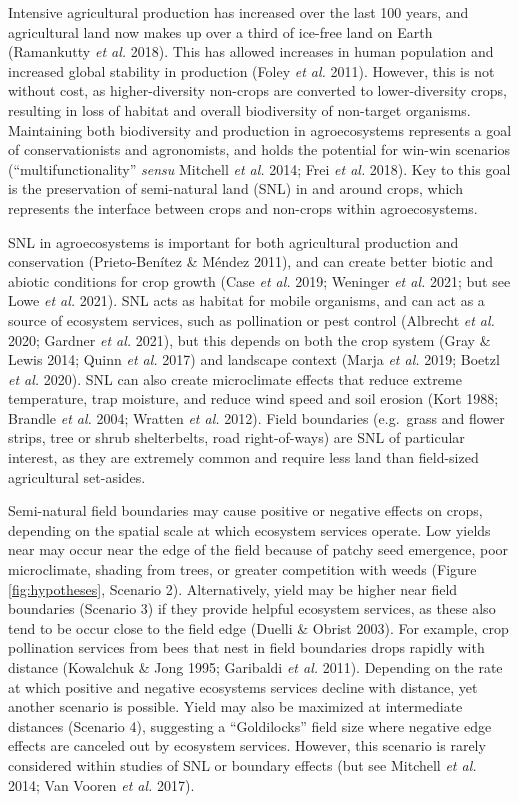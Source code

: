 \documentclass[]{elsarticle} %
\begin{document}
Intensive agricultural production has increased over the last 100 years, and agricultural land now makes up over a third of ice-free land on Earth (Ramankutty \emph{et al.} 2018).
This has allowed increases in human population and increased global stability in production (Foley \emph{et al.} 2011).
However, this is not without cost, as higher-diversity non-crops are converted to lower-diversity crops, resulting in loss of habitat and overall biodiversity of non-target organisms.
Maintaining both biodiversity and production in agroecosystems represents a goal of conservationists and agronomists, and holds the potential for win-win scenarios ({``multifunctionality''} \emph{sensu} Mitchell \emph{et al.} 2014; Frei \emph{et al.} 2018).
Key to this goal is the preservation of semi-natural land (SNL) in and around crops, which represents the interface between crops and non-crops within agroecosystems.

SNL in agroecosystems is important for both agricultural production and conservation (Prieto-Benítez \& Méndez 2011), and can create better biotic and abiotic conditions for crop growth (Case \emph{et al.} 2019; Weninger \emph{et al.} 2021; but see Lowe \emph{et al.} 2021).
SNL acts as habitat for mobile organisms, and can act as a source of ecosystem services, such as pollination or pest control (Albrecht \emph{et al.} 2020; Gardner \emph{et al.} 2021), but this depends on both the crop system (Gray \& Lewis 2014; Quinn \emph{et al.} 2017) and landscape context (Marja \emph{et al.} 2019; Boetzl \emph{et al.} 2020).
SNL can also create microclimate effects that reduce extreme temperature, trap moisture, and reduce wind speed and soil erosion (Kort 1988; Brandle \emph{et al.} 2004; Wratten \emph{et al.} 2012).
Field boundaries (e.g.~grass and flower strips, tree or shrub shelterbelts, road right-of-ways) are SNL of particular interest, as they are extremely common and require less land than field-sized agricultural set-asides.

Semi-natural field boundaries may cause positive or negative effects on crops, depending on the spatial scale at which ecosystem services operate.
Low yields near may occur near the edge of the field because of patchy seed emergence, poor microclimate, shading from trees, or greater competition with weeds (Figure \ref{fig:hypotheses}, Scenario 2).
Alternatively, yield may be higher near field boundaries (Scenario 3) if they provide helpful ecosystem services, as these also tend to be occur close to the field edge (Duelli \& Obrist 2003).
For example, crop pollination services from bees that nest in field boundaries drops rapidly with distance (Kowalchuk \& Jong 1995; Garibaldi \emph{et al.} 2011).
Depending on the rate at which positive and negative ecosystems services decline with distance, yet another scenario is possible.
Yield may also be maximized at intermediate distances (Scenario 4), suggesting a ``Goldilocks'' field size where negative edge effects are canceled out by ecosystem services.
However, this scenario is rarely considered within studies of SNL or boundary effects (but see Mitchell \emph{et al.} 2014; Van Vooren \emph{et al.} 2017).
\end{document}
